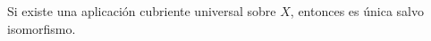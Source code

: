 \begin{ejercicio}
Si existe una aplicación cubriente universal sobre $X$, entonces es única salvo isomorfismo.
\end{ejercicio}

\begin{demostracion}

\end{demostracion}
